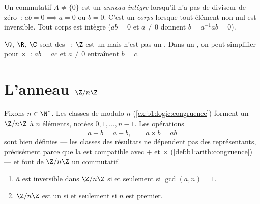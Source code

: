\begin{definition}\label{def:b1:structures:field}
Un  commutatif $A \neq \{0\}$ est un \emph{anneau
intègre} lorsqu'il n'a pas de diviseur de zéro~:
$ab = 0 \implies a = 0$ ou $b = 0$. C'est un \emph{corps}
lorsque tout élément non nul est inversible. Tout corps est intègre
($ab = 0$ et $a \neq 0$ donnent $b = a^{-1}ab = 0$).
\end{definition}

\begin{example}
$\Q$, $\R$, $\C$ sont des ~; $\Z$ est un  mais n'est
pas un . Dans un , on peut simplifier pour $\times$~:
$ab = ac$ et $a \neq 0$ entraînent $b = c$.
\end{example}

\section{L'anneau $\Z/n\Z$}

\begin{definition}\label{def:b1:structures:zn}
Fixons $n \in \N^*$. Les classes de  modulo $n$
(\cref{ex:b1:logic:congruence}) forment un 
$\Z/n\Z$ à $n$ éléments, notées $\overline 0,
\overline 1, \dots, \overline{n-1}$. Les opérations
\[
\overline a + \overline b = \overline{a + b},
\qquad
\overline a \times \overline b = \overline{ab}
\]
sont bien définies --- les classes des résultats ne dépendent pas des
représentants, précisément parce que la  est compatible avec
$+$ et $\times$ (\cref{def:b1:arith:congruence}) --- et font de
$\Z/n\Z$ un  commutatif.
\end{definition}

\begin{theorem}\label{thm:b1:structures:zp}
\begin{enumerate}
  \item $\overline a$ est inversible dans $\Z/n\Z$ si et seulement si
        $\gcd(a, n) = 1$.
  \item $\Z/n\Z$ est un  si et seulement si $n$ est premier.
\end{enumerate}
\end{theorem}

